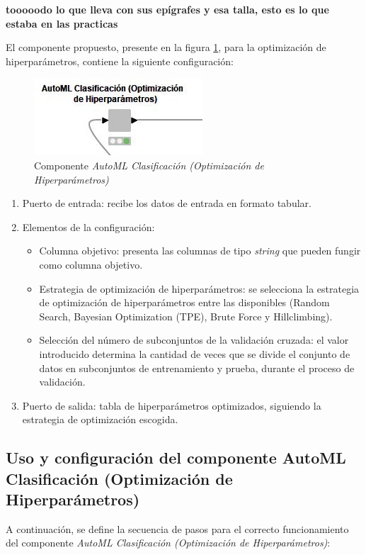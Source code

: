 \textbf{tooooodo lo que lleva con sus epígrafes y esa talla, esto es lo que estaba en las practicas}

El componente propuesto, presente en la figura \ref{fig:automl-componente-hpo}, para la optimización de hiperparámetros, contiene la siguiente configuración:
\begin{figure}[H]
	\centering
	\includegraphics[width=0.35\linewidth]{"figuras/capi 2/automl-componente-hpo"}
	\caption[Componente AutoML Clasificación (Optimización de Hiperparámetros)]{Componente \textit{AutoML Clasificación (Optimización de Hiperparámetros)}}
	\label{fig:automl-componente-hpo}
\end{figure}
\begin{enumerate}
	\item Puerto de entrada: recibe los datos de entrada en formato tabular.
	\item Elementos de la configuración:
	\begin{itemize}
		\item Columna objetivo: presenta las columnas de tipo \textit{string} que pueden fungir como columna objetivo.
		\item Estrategia de optimización de hiperparámetros: se selecciona la estrategia de optimización de hiperparámetros entre las disponibles (Random Search, Bayesian Optimization (TPE), Brute Force y Hillclimbing).
		\item Selección del número de subconjuntos de la validación cruzada: el valor introducido determina la cantidad de veces que se divide el conjunto de datos en subconjuntos de entrenamiento y prueba, durante el proceso de validación.
	\end{itemize}
	\item Puerto de salida: tabla de hiperparámetros optimizados, siguiendo la estrategia de optimización escogida.
\end{enumerate}

\subsection{Uso y configuración del componente AutoML Clasificación (Optimización de Hiperparámetros)}
A continuación, se define la secuencia de pasos para el correcto funcionamiento del componente \textit{AutoML Clasificación (Optimización de Hiperparámetros)}:

